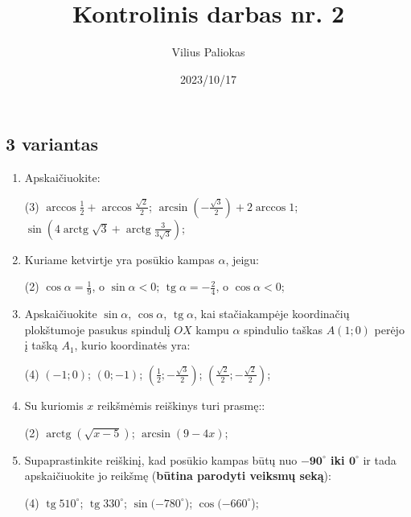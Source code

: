 \documentclass[a4paper]{article}
\title{Kontrolinis darbas nr. 2}
\author{Vilius Paliokas}
\date{2023/10/17}
\DeclareMathOperator{\tg}{tg}
\DeclareMathOperator{\arctg}{arctg}
\begin{document}
\thispagestyle{empty}
\subsection*{3 variantas}

\begin{enumerate}
      \item Apskaičiuokite:

            \begin{tasks}[item-format={\normalfont}, after-item-skip=4mm](3)
                  \task $\arccos{\frac{1}{2}} + \arccos{\frac{\sqrt{2}}{2}} $;
                  \task $\arcsin{(-\frac{\sqrt{3}}{2})} + 2\arccos{1} $;
                  \task $\sin({4\arctg{\sqrt{3}} +
                              \arctg{\frac{3}{3\sqrt{3}}}})  $;

            \end{tasks}

      \item Kuriame ketvirtje yra posūkio kampas $\alpha$, jeigu:
            \begin{tasks}[item-format={\normalfont}, after-item-skip=4mm](2)
                  \task $\cos \alpha = \frac{1}{9}$, o $\sin \alpha < 0$;
                  \task $\tg \alpha = -\frac{2}{4}$, o $\cos \alpha < 0$;
            \end{tasks}
      \item Apskaičiuokite $\sin \alpha$, $\cos \alpha$, $\tg \alpha$, kai
            stačiakampėje koordinačių plokštumoje pasukus spindulį $OX$ kampu
            $\alpha$ spindulio taškas $A(1; 0)$ perėjo į tašką $A_{1}$, kurio
            koordinatės
            yra:
            \begin{tasks}[item-format={\normalfont}, after-item-skip=4mm](4)
                  \task $(-1; 0)$;
                  \task $(0; -1)$;
                  \task $(\frac{1}{2}; -\frac{\sqrt{3}}{2})$;
                  \task $(\frac{\sqrt{2}}{2}; -\frac{\sqrt{2}}{2})$;
            \end{tasks}

      \item Su kuriomis $x$ reikšmėmis reiškinys turi prasmę::
            \begin{tasks}[item-format={\normalfont},
                        after-item-skip=4mm](2)
                  \task $\arctg(\sqrt{x-5})$;
                  \task $\arcsin(9-4x)$;
            \end{tasks}

      \item Supaprastinkite reiškinį, kad posūkio kampas būtų nuo
            \textbf{$\boldsymbol{-90^\circ}$
                  iki  $\boldsymbol{0^\circ}$} ir tada apskaičiuokite jo
            reikšmę
            (\textbf{būtina parodyti veiksmų seką}):
            \begin{tasks}[item-format={\normalfont},
                        after-item-skip=4mm](4)
                  \task $\tg 510^\circ$;
                  \task $\tg 330^\circ$;
                  \task $\sin (-780^\circ$);
                        \task $\cos (-660^\circ$);
            \end{tasks}


\end{enumerate}
\end{document}

